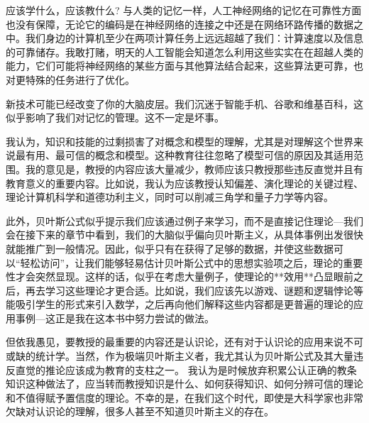 应该学什么，应该教什么?
与人类的记忆一样，人工神经网络的记忆在可靠性方面也没有保障，无论它的编码是在神经网络的连接之中还是在网络环路传播的数据之中。我们身边的计算机至少在两项计算任务上远远超越了我们：计算速度以及信息的可靠储存。我敢打赌，明天的人工智能会知道怎么利用这些实实在在超越人类的能力，它们可能将神经网络的某些方面与其他算法结合起来，这些算法更可靠，也对更特殊的任务进行了优化。

新技术可能已经改变了你的大脑皮层。我们沉迷于智能手机、谷歌和维基百科，这似乎影响了我们对记忆的管理。这不一定是坏事。

我认为，知识和技能的过剩损害了对概念和模型的理解，尤其是对理解这个世界来说最有用、最可信的概念和模型。这种教育往往忽略了模型可信的原因及其适用范围。我的意见是，教授的内容应该大量减少，教师应该只教授那些违反直觉并且有教育意义的重要内容。比如说，我认为应该教授认知偏差、演化理论的关键过程、理论计算机科学和道德功利主义，同时可以削减三角学和量子力学等内容。

此外，贝叶斯公式似乎提示我们应该通过例子来学习，而不是直接记住理论---我们会在接下来的章节中看到，我们的大脑似乎偏向贝叶斯主义，从具体事例出发很快就能推广到一般情况。因此，似乎只有在获得了足够的数据，并使这些数据可以“轻松访问”，让我们能够轻易估计贝叶斯公式中的思想实验项之后，理论的重要性才会突然显现。这样的话，似乎在考虑大量例子，使理论的**效用**凸显眼前之后，再去学习这些理论才更合适。比如说，我们应该先以游戏、谜题和逻辑悖论等能吸引学生的形式来引入数学，之后再向他们解释这些内容都是更普遍的理论的应用事例---这正是我在这本书中努力尝试的做法。

但依我愚见，要教授的最重要的内容还是认识论，还有对于认识论的应用来说不可或缺的统计学。当然，作为极端贝叶斯主义者，我尤其认为贝叶斯公式及其大量违反直觉的推论应该成为教育的支柱之一。
我认为是时候放弃积累公认正确的教条知识这种做法了，应当转而教授知识是什么、如何获得知识、如何分辨可信的理论和不值得赋予置信度的理论。不幸的是，在我们这个时代，即使是大科学家也非常欠缺对认识论的理解，很多人甚至不知道贝叶斯主义的存在。